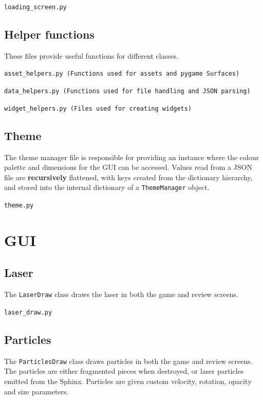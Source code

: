 \documentclass[../main/main.tex]{subfiles}
\begin{document}
\noindent\verb|loading_screen.py|


\subsection{Helper functions}
These files provide useful functions for different classes.

\label{sec:asset-helpers}
\noindent\verb|asset_helpers.py (Functions used for assets and pygame Surfaces)|


\bigskip
\label{sec:data-helpers}
\noindent\verb|data_helpers.py (Functions used for file handling and JSON parsing)|


\bigskip
\noindent\verb|widget_helpers.py (Files used for creating widgets)|


\subsection{Theme}
\label{sec:theme}
The theme manager file is responsible for providing an instance where the colour palette and dimensions for the GUI can be accessed. Values read from a JSON file are \textbf{recursively} flattened, with keys created from the dictionary hierarchy, and stored into the internal dictionary of a \lstinline{ThemeManager} object.

\noindent\verb|theme.py|


\section{GUI}
\subsection{Laser}
The \lstinline{LaserDraw} class draws the laser in both the game and review screens.

\noindent\verb|laser_draw.py|


\subsection{Particles}
The \lstinline{ParticlesDraw} class draws particles in both the game and review screens. The particles are either fragmented pieces when destroyed, or laser particles emitted from the Sphinx. Particles are given custom velocity, rotation, opacity and size parameters.
\end{document}
